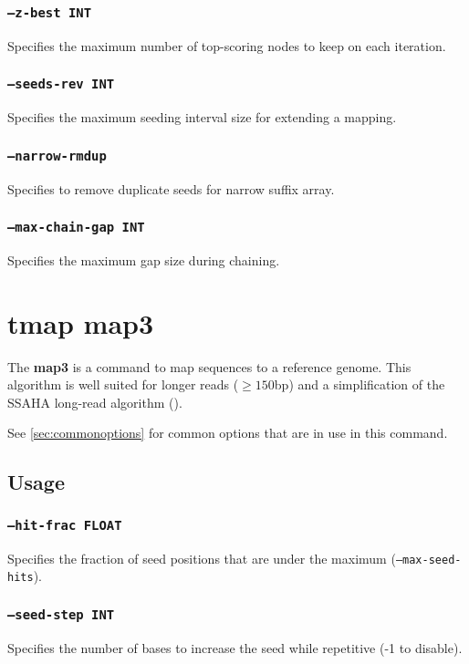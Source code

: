 \documentclass[a4paper,12pt]{book}
\newcommand{\TT}[1]{{\tt #1}} %
\newcommand{\BF}[1]{{\bf #1}} %
\begin{document}
\subsubsection{\TT{--z-best INT}}
Specifies the maximum number of top-scoring nodes to keep on each iteration.

\subsubsection{\TT{--seeds-rev INT}}
Specifies the maximum seeding interval size for extending a mapping.

\subsubsection{\TT{--narrow-rmdup}}
Specifies to remove duplicate seeds for narrow suffix array.

\subsubsection{\TT{--max-chain-gap INT}}
Specifies the maximum gap size during chaining.

\section{tmap map3}
\label{sec:map3}
The \BF{map3} is a command to map sequences to a reference genome.
This algorithm is well suited for longer reads ($\geq 150$bp) and a simplification of the SSAHA long-read algorithm (\cite{SSAHA}).

See \autoref{sec:commonoptions} for common options that are in use in this command.

\subsection{Usage}

\subsubsection{\TT{--hit-frac FLOAT}}
Specifies the fraction of seed positions that are under the maximum (\TT{--max-seed-hits}).

\subsubsection{\TT{--seed-step INT}}
Specifies the number of bases to increase the seed while repetitive (-1 to disable).
\end{document}
